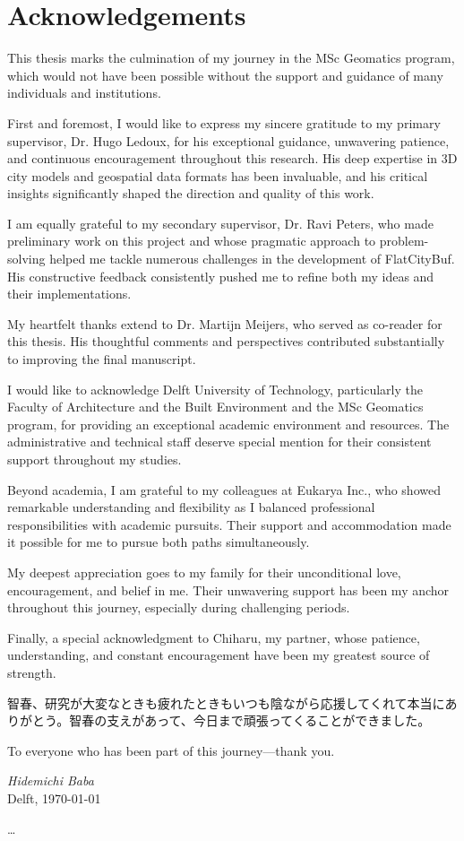 \chapter*{Acknowledgements}

This thesis marks the culmination of my journey in the MSc Geomatics program, which would not have been possible without the support and guidance of many individuals and institutions.

First and foremost, I would like to express my sincere gratitude to my primary supervisor, Dr. Hugo Ledoux, for his exceptional guidance, unwavering patience, and continuous encouragement throughout this research. His deep expertise in 3D city models and geospatial data formats has been invaluable, and his critical insights significantly shaped the direction and quality of this work.

I am equally grateful to my secondary supervisor, Dr. Ravi Peters, who made preliminary work on this project and whose pragmatic approach to problem-solving helped me tackle numerous challenges in the development of FlatCityBuf. His constructive feedback consistently pushed me to refine both my ideas and their implementations.

My heartfelt thanks extend to Dr. Martijn Meijers, who served as co-reader for this thesis. His thoughtful comments and perspectives contributed substantially to improving the final manuscript.

I would like to acknowledge Delft University of Technology, particularly the Faculty of Architecture and the Built Environment and the MSc Geomatics program, for providing an exceptional academic environment and resources. The administrative and technical staff deserve special mention for their consistent support throughout my studies.

Beyond academia, I am grateful to my colleagues at Eukarya Inc., who showed remarkable understanding and flexibility as I balanced professional responsibilities with academic pursuits. Their support and accommodation made it possible for me to pursue both paths simultaneously.

My deepest appreciation goes to my family for their unconditional love, encouragement, and belief in me. Their unwavering support has been my anchor throughout this journey, especially during challenging periods.

Finally, a special acknowledgment to Chiharu, my partner, whose patience, understanding, and constant encouragement have been my greatest source of strength.
\begin{CJK}{UTF8}{min}
  智春、研究が大変なときも疲れたときもいつも陰ながら応援してくれて本当にありがとう。智春の支えがあって、今日まで頑張ってくることができました。
\end{CJK}

To everyone who has been part of this journey—thank you.

\vspace{1cm}

\begin{flushright}
  \textit{Hidemichi Baba}\\
  Delft, \today
\end{flushright}

\ldots
